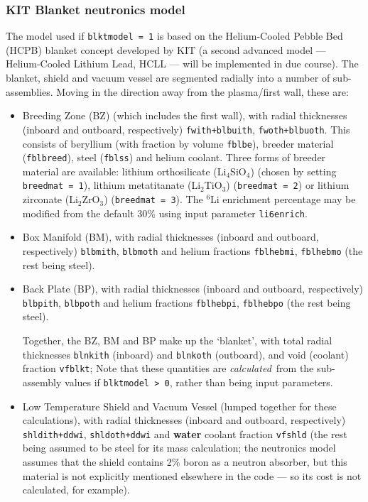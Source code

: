 \documentclass[11pt,a4paper]{report}
\begin{document}
\subsubsection{KIT Blanket neutronics model}
\label{sec:blanket_neutronics}

The model used if \texttt{blktmodel = 1} is based on the Helium-Cooled Pebble
Bed (HCPB) blanket concept developed by KIT (a second advanced model ---
Helium-Cooled Lithium Lead, HCLL --- will be implemented in due course). The
blanket, shield and vacuum vessel are segmented radially into a number of
sub-assemblies. Moving in the direction away from the plasma/first wall, these
are:
\begin{itemize}

\item Breeding Zone (BZ) (which includes the first wall), with radial
  thicknesses (inboard and outboard, respectively) \texttt{fwith+blbuith},
  \texttt{fwoth+blbuoth}. This consists of beryllium (with fraction by volume
  \texttt{fblbe}), breeder material (\texttt{fblbreed}), steel
  (\texttt{fblss}) and helium coolant. Three forms of breeder material are
  available: lithium orthosilicate (Li$_4$SiO$_4$) (chosen by setting
  \texttt{breedmat = 1}), lithium metatitanate (Li$_2$TiO$_3$)
  (\texttt{breedmat = 2}) or lithium zirconate (Li$_2$ZrO$_3$)
  (\texttt{breedmat = 3}). The $^6$Li enrichment percentage may be modified
  from the default 30\% using input parameter \texttt{li6enrich}.

\item Box Manifold (BM), with radial thicknesses (inboard and outboard,
  respectively) \texttt{blbmith}, \texttt{blbmoth} and helium fractions
  \texttt{fblhebmi}, \texttt{fblhebmo} (the rest being steel).

\item Back Plate (BP), with radial thicknesses (inboard and outboard,
  respectively) \texttt{blbpith}, \texttt{blbpoth} and helium fractions
  \texttt{fblhebpi}, \texttt{fblhebpo} (the rest being steel).

Together, the BZ, BM and BP make up the `blanket', with total radial
thicknesses \texttt{blnkith} (inboard) and \texttt{blnkoth} (outboard), and
void (coolant) fraction \texttt{vfblkt}; Note that these
quantities are \textit{calculated}\ from the sub-assembly values if
\texttt{blktmodel > 0}, rather than being input parameters.

\item Low Temperature Shield and Vacuum Vessel (lumped together for these
  calculations), with radial thicknesses (inboard and outboard, respectively)
  \texttt{shldith+ddwi}, \texttt{shldoth+ddwi} and \textbf{water} coolant
  fraction \texttt{vfshld} (the rest being assumed to be steel for its mass
  calculation; the neutronics model assumes that the shield contains 2\% boron
  as a neutron absorber, but this material is not explicitly mentioned
  elsewhere in the code --- so its cost is not calculated, for example).


\end{itemize}
\end{document}

